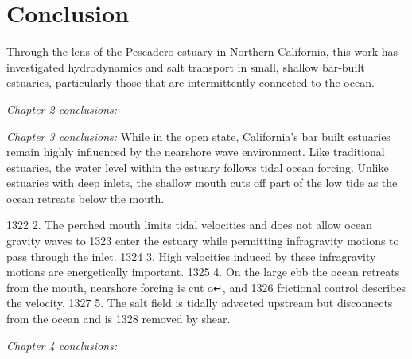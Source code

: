 \chapter{Conclusion}
\label{conclusion}

Through the lens of the Pescadero estuary in Northern California, this work has investigated hydrodynamics and salt transport in small, shallow bar-built estuaries, particularly those that are intermittently connected to the ocean. 

\emph{Chapter 2 conclusions:}

\emph{Chapter 3 conclusions:}
While in the open state, California's bar built estuaries remain highly influenced by the nearshore wave environment. Like traditional estuaries, the water level within the estuary follows tidal ocean forcing. Unlike estuaries with deep inlets, the shallow mouth cuts off part of the low tide as the ocean retreats below the mouth. 


1322 2. The perched mouth limits tidal velocities and does not allow ocean gravity waves to
1323 enter the estuary while permitting infragravity motions to pass through the inlet.
1324 3. High velocities induced by these infragravity motions are energetically important.
1325 4. On the large ebb the ocean retreats from the mouth, nearshore forcing is cut o↵, and
1326 frictional control describes the velocity.
1327 5. The salt field is tidally advected upstream but disconnects from the ocean and is
1328 removed by shear.


\emph{Chapter 4 conclusions:}
